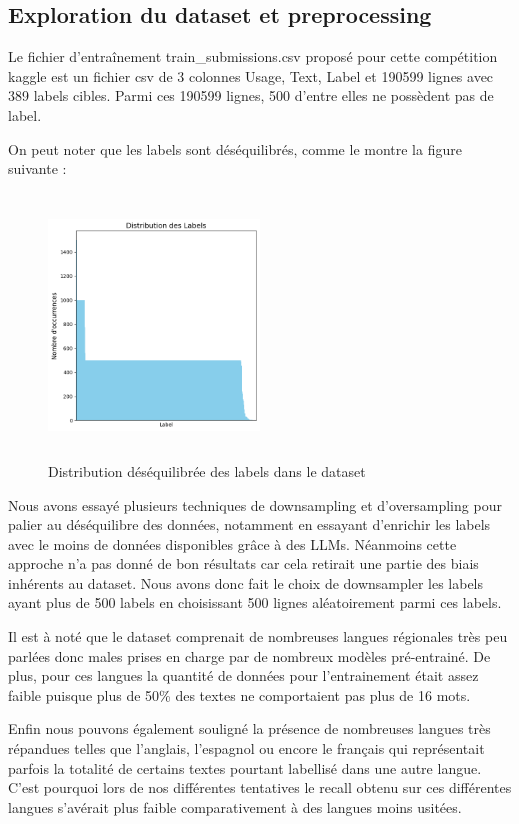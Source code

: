 \subsection{Exploration du dataset et preprocessing}

Le fichier d'entraînement train\_submissions.csv proposé pour cette compétition kaggle est un fichier csv de 3 colonnes Usage, Text, Label et 190599 lignes avec 389 labels cibles. Parmi ces 190599 lignes, 500 d'entre elles ne possèdent pas de label. 

On peut noter que les labels sont déséquilibrés, comme le montre la figure suivante :

\begin{figure}[h!]
    \centering
    \includegraphics[width=0.5\textwidth, height=7cm]{img/unbalance.png}
    \caption{Distribution déséquilibrée des labels dans le dataset}
    \label{fig:unbalance}
\end{figure}

Nous avons essayé plusieurs techniques de downsampling et d'oversampling pour palier au déséquilibre des données, notamment en essayant d'enrichir les labels avec le moins de données disponibles grâce à des LLMs. Néanmoins cette approche n'a pas donné de bon résultats car cela retirait une partie des biais inhérents au dataset. Nous avons donc fait le choix de downsampler les labels ayant plus de 500 labels en choisissant 500 lignes aléatoirement parmi ces labels.

Il est à noté que le dataset comprenait de nombreuses langues régionales très peu parlées donc males prises en charge par de nombreux modèles pré-entrainé. De plus, pour ces langues la quantité de données pour l'entrainement était assez faible puisque plus de 50\% des textes ne comportaient pas plus de 16 mots. 

Enfin nous pouvons également souligné la présence de nombreuses langues très répandues telles que l'anglais, l'espagnol ou encore le français qui représentait parfois la totalité de certains textes pourtant labellisé dans une autre langue. C'est pourquoi lors de nos différentes tentatives le recall obtenu sur ces différentes langues s'avérait plus faible comparativement à des langues moins usitées.

